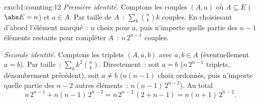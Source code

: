 \begin{solution}{exo:b1:counting:12}
\emph{Première identité.} Comptons les couples $(A, a)$ où $A \subseteq E$
($\abs E = n$) et $a \in A$. Par taille de $A$~: $\sum_k \binom nk k$
couples. En choisissant d'abord l'élément marqué~: $n$ choix pour $a$, puis
n'importe quelle partie des $n - 1$ éléments restants pour compléter $A$~:
$n\,2^{n-1}$ couples.

\emph{Seconde identité.} Comptons les triplets $(A, a, b)$ avec $a, b \in
A$ (éventuellement $a = b$). Par taille~: $\sum_k k^2 \binom nk$.
Directement~: soit $a = b$ ($n\,2^{n-1}$ triplets, dénombrement précédent),
soit $a \neq b$ ($n(n-1)$ choix ordonnés, puis n'importe quelle partie des
$n - 2$ autres éléments~: $n(n-1)\,2^{n-2}$). Au total
\[
n\,2^{n-1} + n(n-1)\,2^{n-2} = n\,2^{n-2}\,(2 + n - 1)
= n(n+1)\,2^{n-2} .
\]
\end{solution}


